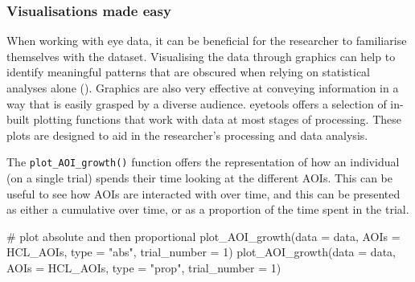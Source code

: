 \documentclass[
  man,
  floatsintext,
  longtable,
  nolmodern,
  notxfonts,
  notimes,
  colorlinks=true,linkcolor=blue,citecolor=blue,urlcolor=blue]{apa7}
\newenvironment{Shaded}{\begin{snugshade}}{\end{snugshade}}
\newcommand{\AttributeTok}[1]{\textcolor[rgb]{0.40,0.45,0.13}{#1}}
\newcommand{\CommentTok}[1]{\textcolor[rgb]{0.37,0.37,0.37}{#1}}
\newcommand{\DecValTok}[1]{\textcolor[rgb]{0.68,0.00,0.00}{#1}}
\newcommand{\FunctionTok}[1]{\textcolor[rgb]{0.28,0.35,0.67}{#1}}
\newcommand{\NormalTok}[1]{\textcolor[rgb]{0.00,0.23,0.31}{#1}}
\newcommand{\StringTok}[1]{\textcolor[rgb]{0.13,0.47,0.30}{#1}}
\begin{document}
\subsubsection{Visualisations made easy}\label{visualisations-made-easy}

When working with eye data, it can be beneficial for the researcher to
familiarise themselves with the dataset. Visualising the data through
graphics can help to identify meaningful patterns that are obscured when
relying on statistical analyses alone
().
Graphics are also very effective at conveying information in a way that
is easily grasped by a diverse audience. eyetools offers a selection of
in-built plotting functions that work with data at most stages of
processing. These plots are designed to aid in the researcher's
processing and data analysis.

The \texttt{plot\_AOI\_growth()} function offers the representation of
how an individual (on a single trial) spends their time looking at the
different AOIs. This can be useful to see how AOIs are interacted with
over time, and this can be presented as either a cumulative over time,
or as a proportion of the time spent in the trial.

\begin{Shaded}
\begin{Highlighting}[]
\CommentTok{\# plot absolute and then proportional}
\FunctionTok{plot\_AOI\_growth}\NormalTok{(}\AttributeTok{data =}\NormalTok{ data, }
                \AttributeTok{AOIs =}\NormalTok{ HCL\_AOIs, }
                \AttributeTok{type =} \StringTok{"abs"}\NormalTok{, }
                \AttributeTok{trial\_number =} \DecValTok{1}\NormalTok{)}
\FunctionTok{plot\_AOI\_growth}\NormalTok{(}\AttributeTok{data =}\NormalTok{ data, }
                \AttributeTok{AOIs =}\NormalTok{ HCL\_AOIs, }
                \AttributeTok{type =} \StringTok{"prop"}\NormalTok{, }
                \AttributeTok{trial\_number =} \DecValTok{1}\NormalTok{)}
\end{Highlighting}
\end{Shaded}
\end{document}
